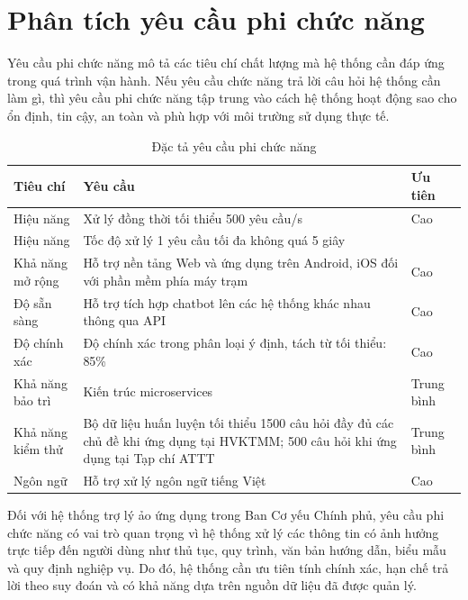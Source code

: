 \section{Phân tích yêu cầu phi chức năng}

Yêu cầu phi chức năng mô tả các tiêu chí chất lượng mà hệ thống cần đáp ứng trong quá trình vận hành. Nếu yêu cầu chức năng trả lời câu hỏi hệ thống cần làm gì, thì yêu cầu phi chức năng tập trung vào cách hệ thống hoạt động sao cho ổn định, tin cậy, an toàn và phù hợp với môi trường sử dụng thực tế.

\begin{table}[H]
    \centering
    \caption{Đặc tả yêu cầu phi chức năng}
    \label{tab:non_functional_requirements_spec}
    \small
    \begin{tabularx}{\textwidth}{|p{3cm}|X|p{2cm}|}
        \hline
        \textbf{Tiêu chí} & \textbf{Yêu cầu} & \textbf{Ưu tiên} \\ \hline
        Hiệu năng & Xử lý đồng thời tối thiểu 500 yêu cầu/s & Cao \\ \hline
        Hiệu năng & Tốc độ xử lý 1 yêu cầu tối đa không quá 5 giây &  \\ \hline
        Khả năng mở rộng & Hỗ trợ nền tảng Web và ứng dụng trên Android, iOS đối với phần mềm phía máy trạm & Cao \\ \hline
        Độ sẵn sàng & Hỗ trợ tích hợp chatbot lên các hệ thống khác nhau thông qua API & Cao \\ \hline
        Độ chính xác & Độ chính xác trong phân loại ý định, tách từ tối thiểu: 85\% & Cao \\ \hline
        Khả năng bảo trì & Kiến trúc microservices & Trung bình \\ \hline
        Khả năng kiểm thử & Bộ dữ liệu huấn luyện tối thiểu 1500 câu hỏi đầy đủ các chủ đề khi ứng dụng tại HVKTMM; 500 câu hỏi khi ứng dụng tại Tạp chí ATTT & Trung bình \\ \hline
        Ngôn ngữ & Hỗ trợ xử lý ngôn ngữ tiếng Việt & Cao \\ \hline
    \end{tabularx}
\end{table}

Đối với hệ thống trợ lý ảo ứng dụng trong Ban Cơ yếu Chính phủ, yêu cầu phi chức năng có vai trò quan trọng vì hệ thống xử lý các thông tin có ảnh hưởng trực tiếp đến người dùng như thủ tục, quy trình, văn bản hướng dẫn, biểu mẫu và quy định nghiệp vụ. Do đó, hệ thống cần ưu tiên tính chính xác, hạn chế trả lời theo suy đoán và có khả năng dựa trên nguồn dữ liệu đã được quản lý.

